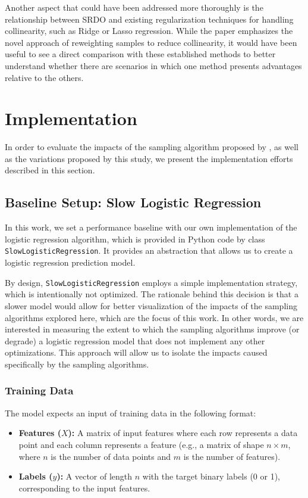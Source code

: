 \documentclass{article}
\theoremstyle{plain}
\theoremstyle{definition}
\theoremstyle{remark}
\begin{document}
Another aspect that could have been addressed more thoroughly is the relationship between SRDO and existing regularization techniques for handling collinearity, such as Ridge or Lasso regression. While the paper emphasizes the novel approach of reweighting samples to reduce collinearity, it would have been useful to see a direct comparison with these established methods to better understand whether there are scenarios in which one method presents advantages relative to the others.


\section{Implementation}

In order to evaluate the impacts of the sampling algorithm proposed by \citeauthor{chow24}, as well as the variations proposed by this study, we present the implementation efforts described in this section.

\subsection{Baseline Setup: Slow Logistic Regression}

In this work, we set a performance baseline with our own implementation of the logistic regression algorithm, which is provided in Python code by class \texttt{SlowLogisticRegression}. It provides an abstraction that allows us to create a logistic regression prediction model.

By design, \texttt{SlowLogisticRegression} employs a simple implementation strategy, which is intentionally not optimized. The rationale behind this decision is that a slower model would allow for better visualization of the impacts of the sampling algorithms explored here, which are the focus of this work. In other words, we are interested in measuring the extent to which the sampling algorithms improve (or degrade) a logistic regression model that does not implement any other optimizations. This approach will allow us to isolate the impacts caused specifically by the sampling algorithms.


\subsubsection{Training Data}

The model expects an input of training data in the following format:
\begin{itemize}

\item \textbf{Features ($X$):} A matrix of input features where each row represents a data point and each column represents a feature (e.g., a matrix of shape $n \times m$, where $n$ is the number of data points and $m$ is the number of features).

\item \textbf{Labels ($y$):} A vector of length $n$ with the target binary labels (0 or 1), corresponding to the input features.
\end{itemize}
\end{document}
